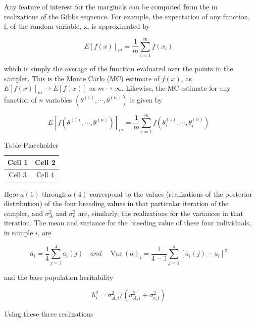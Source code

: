 \documentclass{article}
\begin{document}
Any feature of interest for the marginals can be computed from the m realizations of the Gibbs sequence. For example, the expectation of any function, f, of the random variable, x, is approximated by

\begin{equation}
E[f(x)]_{m}=\frac{1}{m}\sum_{i=1}^{m}f(x_{i})
\tag{19.32a}
\label{eq:19_32a}
\end{equation}

which is simply the average of the function evaluated over the points in the sampler. This is the Monte Carlo (MC) estimate of  $ f(x) $, as  $ E[f(x)]_m \to E[f(x)] $ as  $ m \to \infty $. Likewise, the MC estimate for any function of  $ n $ variables  $ (\theta^{(1)}, \cdots, \theta^{(n)}) $ is given by

\begin{equation}
E[f(\theta^{(1)},\cdots,\theta^{(n)})]_{m}=\frac{1}{m}\sum_{i=1}^{m}f(\theta^{(1)}_{i},\cdots,\theta^{(n)}_{i})
\tag{19.32b}
\label{eq:19_32b}
\end{equation}

\begin{table}[h]
\centering
\begin{tabular}{|c|c|}
\hline
Cell 1 & Cell 2 \\
\hline
Cell 3 & Cell 4 \\
\hline
\end{tabular}
\caption{Table Placeholder}
\end{table}

Here  $ a(1) $ through  $ a(4) $ correspond to the values (realizations of the posterior distribution) of the four breeding values in that particular iteration of the sampler, and  $ \sigma_A^2 $ and  $ \sigma_e^2 $ are, similarly, the realizations for the variances in that iteration. The mean and variance for the breeding value of these four individuals, in sample  $ i $, are

\begin{equation}
\overline{a}_{i}=\frac{1}{4}\sum_{j=1}^{4}a_{i}(j)\quad and\quad\operatorname{Var}(a)_{i}=\frac{1}{4-1}\sum_{j=1}^{4}\left[a_{i}(j)-\overline{a}_{i}\right]^{2}
\end{equation}

and the base population heritability

\begin{equation}
h_{i}^{2}=\sigma_{A,i}^{2}/(\sigma_{A,i}^{2}+\sigma_{e,i}^{2})
\end{equation}

Using these three realizations
\end{document}
